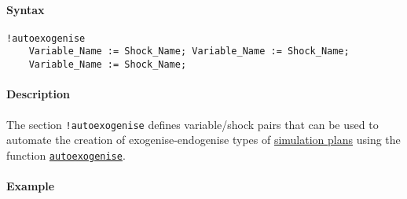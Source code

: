 


	\paragraph{Syntax}

\begin{verbatim}
!autoexogenise
    Variable_Name := Shock_Name; Variable_Name := Shock_Name;
    Variable_Name := Shock_Name;
\end{verbatim}

\paragraph{Description}

The section \texttt{!autoexogenise} defines variable/shock pairs that
can be used to automate the creation of exogenise-endogenise types of
\href{plan/Contents}{simulation plans} using the function
\href{plan/autoexogenise}{\texttt{autoexogenise}}.

\paragraph{Example}


